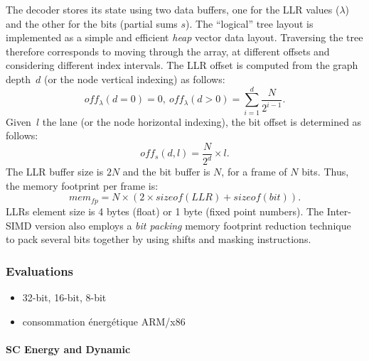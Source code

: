 The decoder stores its state using two data buffers, one for the LLR values
($\lambda$) and the other for the bits (partial sums $s$). The ``logical'' tree
layout is implemented as a simple and efficient \emph{heap} vector data layout.
Traversing the tree therefore corresponds to moving through the array, at
different offsets and considering different index intervals. The LLR offset is
computed from the graph depth~$d$ (or the node vertical indexing) as follows:
\begin{equation}
  off_{\lambda}(d = 0) = 0,~off_{\lambda}(d > 0) = \sum\limits_{i = 1}^{d} \frac{N}{2^{i-1}}.
\end{equation}
Given~$l$ the lane (or the node horizontal indexing), the bit offset is
determined as follows:
\begin{equation}
  off_{s}(d,l) = \frac{N}{2^d} \times l.
\end{equation}
The LLR buffer size is $2N$ and the bit buffer is $N$, for a frame of $N$ bits.
Thus, the memory footprint per frame is:
\begin{equation}
  mem_{fp} = N \times (2 \times sizeof(LLR) + sizeof(bit)).
\end{equation}
LLRs element size is 4 bytes (float) or 1 byte (fixed point numbers). The
Inter-SIMD version also employs a \emph{bit packing} memory footprint reduction
technique~\cite{LeGal2015a} to pack several bits together by using shifts and
masking instructions.

\subsubsection{Evaluations}

\begin{itemize}
  \item 32-bit, 16-bit, 8-bit
  \item consommation énergétique ARM/x86
\end{itemize}

\paragraph{SC Energy and Dynamic}

